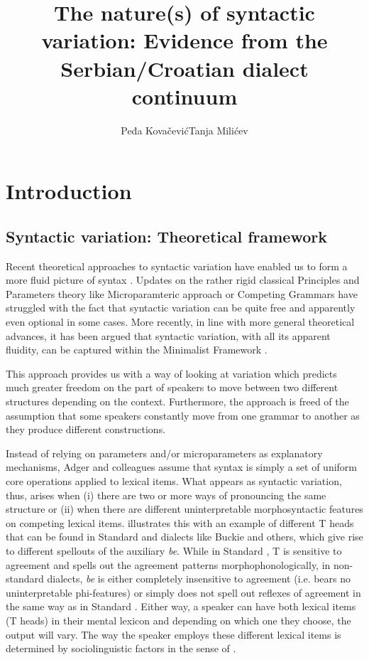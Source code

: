 \documentclass[output=paper,modfonts,newtxmath,hidelinks,]{langscibook}
\title{The nature(s) of syntactic variation: Evidence from the Serbian/Croatian dialect continuum}
\author{Peđa Kovačević\affiliation{University of Novi Sad}\lastand  Tanja Milićev\affiliation{University of Novi Sad}}
\begin{document}
\maketitle
{}

\section{Introduction}\label{7:s1}

\subsection{Syntactic variation: {T}heoretical framework}\label{7:s1.1}

Recent theoretical approaches to syntactic variation have enabled us to form a more fluid picture of syntax \citep{Adger2006,AdgerTrousdale2007,AdgerSmith2005}. Updates on the rather rigid classical Principles and Parameters theory \citep{ChomskyLasnik1995} like   Microparamteric approach or  Competing Grammars have struggled with the fact that syntactic variation can be quite free and apparently even optional in some cases. More recently, in line with more general theoretical advances, it has been argued that syntactic variation, with all its apparent fluidity, can be captured within the Minimalist Framework \citep{Adger2006,AdgerTrousdale2007,AdgerSmith2005}.

This approach provides us with a way of looking at variation which predicts much greater freedom on the part of speakers to move between two different structures depending on the context. Furthermore, the approach is freed of the assumption that some speakers constantly move from one grammar to another as they produce different constructions.\largerpage[2]

Instead of relying on parameters and/or microparameters as explanatory mechanisms, Adger and colleagues assume that syntax is simply a set of uniform core operations applied to lexical items. What appears as syntactic variation, thus, arises when (i) there are two or more ways of pronouncing the same structure or (ii) when there are different uninterpretable morphosyntactic features on competing lexical items. \citet{Adger2006} illustrates this with an example of different T heads that can be found in Standard  and dialects like Buckie  and others, which give rise to different spellouts of the auxiliary \textit{be}. While in Standard , T is sensitive to agreement and spells out the agreement patterns morphophonologically, in non-standard dialects, \textit{be} is either completely insensitive to agreement (i.e. bears no uninterpretable phi-features) or simply does not spell out reflexes of agreement in the same way as in Standard . Either way, a speaker can have both lexical items (T heads) in their mental lexicon and depending on which one they choose, the output will vary. The way the speaker employs these different lexical items is determined by sociolinguistic factors in the sense of \citet{Labov1972}.
\end{document}

